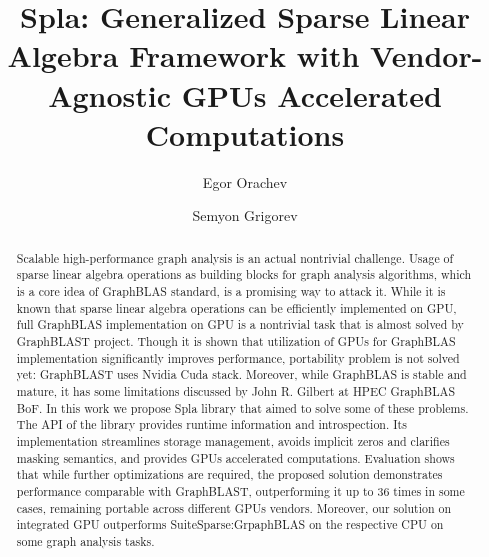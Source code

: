 \documentclass[sigconf, anonymous, review,table]{acmart}
\begin{document}
\title[Generalized Sparse Linear Algebra Framework with Vendor-Agnostic GPUs Accelerated Computations]{Spla: Generalized Sparse Linear Algebra Framework with Vendor-Agnostic GPUs Accelerated Computations}

\author{Egor Orachev}
\author{Semyon Grigorev}



\renewcommand{\shortauthors}{Orachev, Grigorev}


\begin{abstract}
    Scalable high-performance graph analysis is an actual nontrivial challenge. Usage of sparse linear algebra operations as building blocks for graph analysis algorithms, which is a core idea of GraphBLAS standard, is a promising way to attack it.
    While it is known that sparse linear algebra operations can be efficiently implemented on GPU, full GraphBLAS implementation on GPU is a nontrivial task that is almost solved by GraphBLAST project. Though it is shown that utilization of GPUs for GraphBLAS implementation significantly improves performance, portability problem is not solved yet: GraphBLAST uses Nvidia Cuda stack. 
    Moreover, while GraphBLAS is stable and mature, it has some limitations discussed by John R. Gilbert at HPEC GraphBLAS BoF. 
    In this work we propose Spla library that aimed to solve some of these problems. The API of the library provides runtime information and introspection. Its implementation streamlines storage management, avoids implicit zeros and clarifies masking semantics, and provides GPUs accelerated computations.
    Evaluation shows that while further optimizations are required, the proposed solution demonstrates performance comparable with GraphBLAST, outperforming it up to 36 times in some cases, remaining portable across different GPUs vendors. Moreover, our solution on integrated GPU outperforms SuiteSparse:GrpaphBLAS on the respective CPU on some graph analysis tasks.
\end{abstract}
\end{document}
